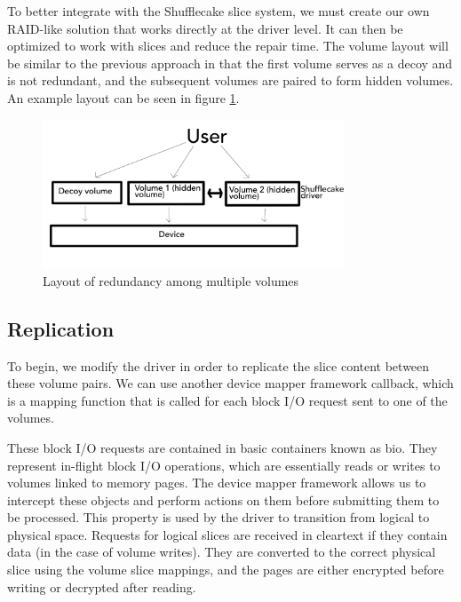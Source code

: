 \documentclass[a4paper,11pt,oneside]{report}
\begin{document}
To better integrate with the Shufflecake slice system, we must create our own RAID-like solution that works directly at the driver level. It can then be optimized to work with slices and reduce the repair time. The volume layout will be similar to the previous approach in that the first volume serves as a decoy and is not redundant, and the subsequent volumes are paired to form hidden volumes. An example layout can be seen in figure \ref{fig:red_among}.

\begin{figure}[ht]
\centering
\includegraphics[width=0.8\textwidth]{Figures/red_among.png}
\caption{Layout of redundancy among multiple volumes}
\label{fig:red_among}
\end{figure}

\subsection{Replication}

To begin, we modify the driver in order to replicate the slice content between these volume pairs. We can use another device mapper framework callback, which is a mapping function that is called for each block I/O request sent to one of the volumes.

These block I/O requests are contained in basic containers known as bio. They represent in-flight block I/O operations, which are essentially reads or writes to volumes linked to memory pages. The device mapper framework allows us to intercept these objects and perform actions on them before submitting them to be processed. This property is used by the driver to transition from logical to physical space. Requests for logical slices are received in cleartext if they contain data (in the case of volume writes). They are converted to the correct physical slice using the volume slice mappings, and the pages are either encrypted before writing or decrypted after reading\cite{10.5555/1855096}.
\end{document}
